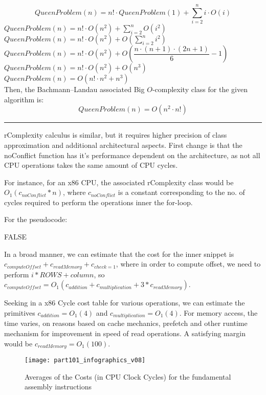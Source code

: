 \[QueenProblem(n) = n! \cdot QueenProblem(1) + \sum_{i=2}^{n} i\cdot O(i) \]
$QueenProblem(n) = n! \cdot O(n^2) + \sum_{i=2}^{n} O(i^2)$ \\
$QueenProblem(n) = n! \cdot O(n^2) + O(\sum_{i=2}^{n} i^2)$ \\
$QueenProblem(n) = n! \cdot O(n^2) + O(\dfrac{n\cdot(n+1)\cdot(2n+1)}{6} - 1)$ \\
$QueenProblem(n) = n! \cdot O(n^2) + O(n^3)$ \\
$QueenProblem(n) = O(n! \cdot n^2 + n^3) $ \\

Then, the Bachmann–Landau associated Big $O$-complexity class for the given algorithm is:
\[QueenProblem(n) = O(n^2\cdot n!) \]

\noindent\rule{16cm}{0.4pt}

rComplexity calculus is similar, but it requires higher precision of class approximation and additional architectural aspects.
First change is that the noConflict function has it's performance dependent on the architecture, as not all CPU operations takes the same amount of CPU cycles.


For instance, for an x86 CPU, the associated rComplexity class would be
$ O_{1}(c_{noConflict} * n) $, where $c_{noConflict}$ is a constant corresponding to the no. of cycles required to perform the operations inner the for-loop.

For the pseudocode:
\begin{algorithmic}[1]
    \State \Return FALSE
    \EndIf
    \EndFor
\end{algorithmic}
In a broad manner, we can estimate that the cost for the inner snippet is $c_{computeOffset} + c_{readMemory} + c_{check=1}$, where in order to compute offset, we need to perform $i * ROWS + column$, so
$ c_{computeOffset} = O_{1}(c_{addition} + c_{multiplication} + 3 * c_{readMemory})$.


Seeking in a x86 Cycle cost table for various operations, we can estimate the primitives $c_{addition} = O_{1}(4)$ and $c_{multiplication} = O_{1}(4)$. For memory access, the time varies, on reasons based on cache mechanics, prefetch and other runtime mechanism for improvement in speed of read operations. A satisfying margin would be $c_{readMemory} = O_{1}(100)$.

\begin{figure}[H]
    \centering
    \texttt{[image: part101\_infographics\_v08]}
    \caption{Averages of the Costs (in CPU Clock Cycles) for the fundamental assembly instructions \cite{archcost}}
\end{figure}

